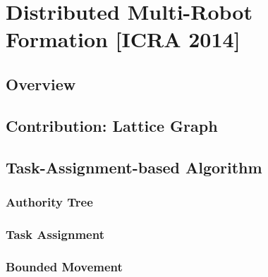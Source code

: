 \documentclass[10pt]{beamer}
\begin{document}




\section{Distributed Multi-Robot Formation [ICRA 2014]}
\subsection[Overview]{Overview}







\subsection[Lattice Graph]{Contribution: Lattice Graph}








\subsection[Algorithm2]{Task-Assignment-based Algorithm}


\subsubsection[Algorithm2: Authority]{Authority Tree}





\subsubsection[Algorithm2: Task Assignment]{Task Assignment}






\subsubsection[Algorithm2: Motion Strategy]{Bounded Movement}
\end{document}
